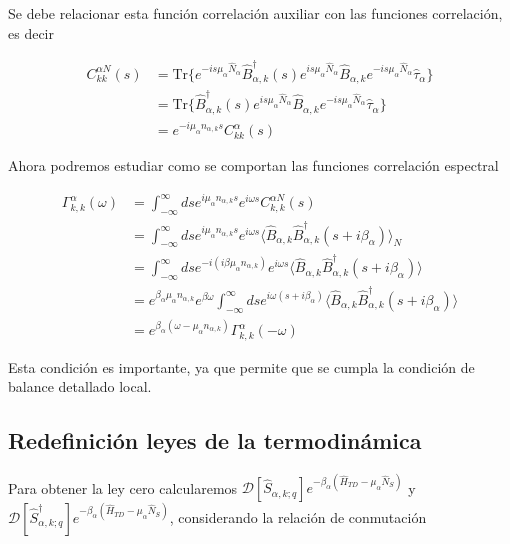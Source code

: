 \begin{appendixs}
Se debe relacionar esta función correlación auxiliar con las funciones correlación, es decir

\begin{align*}
    C^{\alpha N}_{kk}(s) & = \text{Tr}\{e^{-is\mu_{\alpha}\hat{N}_{\alpha} }\hat{B}^{\dagger}_{\alpha,k}(s)e^{is\mu_{\alpha}\hat{N}_{\alpha}} \hat{B}_{\alpha,k}e^{-is\mu_{\alpha}\hat{N}_{\alpha} }\hat{\tau}_{\alpha}   \} \\
 & = \text{Tr}\{\hat{B}^{\dagger}_{\alpha,k}(s)e^{is\mu_{\alpha}\hat{N}_{\alpha}} \hat{B}_{\alpha,k}e^{-is\mu_{\alpha}\hat{N}_{\alpha}}\hat{\tau}_{\alpha}   \}\\
 & = e^{-i\mu_{\alpha}n_{\alpha,k}s} C^{\alpha}_{kk}(s)
\end{align*}

Ahora podremos estudiar como se comportan las funciones correlación espectral

\begin{align*}
    \Gamma^{\alpha}_{k,k}(\omega) & = \int_{-\infty}^{\infty}ds e^{i\mu_{\alpha}n_{\alpha,k}s} e^{i\omega s}C^{\alpha N}_{k,k}(s) \\
    & = \int_{-\infty}^{\infty}ds e^{i\mu_{\alpha}n_{\alpha,k}s} e^{i\omega s}\langle \hat{B}_{\alpha,k} \hat{B}^{\dagger}_{\alpha,k}(s+i\beta_{\alpha}) \rangle_{N} \\
    & = \int_{-\infty}^{\infty}ds e^{-i(i\beta \mu_{\alpha}n_{\alpha,k})} e^{i\omega s} \langle \hat{B}_{\alpha,k}\hat{B}^{\dagger}_{\alpha,k}(s+i\beta_{\alpha}) \rangle \\
    & = e^{\beta_{\alpha}\mu_{\alpha}n_{\alpha,k}}e^{\beta \omega} \int_{-\infty}^{\infty} ds e^{i\omega(s+i\beta_{\alpha})} \langle \hat{B}_{\alpha,k}\hat{B}^{\dagger}_{\alpha,k}(s+i\beta_{\alpha}) \rangle \\
    & = e^{\beta_{\alpha}(\omega - \mu_{\alpha}n_{\alpha,k})} \Gamma^{\alpha}_{k,k}(-\omega)
\end{align*}


Esta condición es importante, ya que permite que se cumpla la condición de balance detallado local. 

\label{apendixKMS}


\newpage

\subsection{Redefinición leyes de la termodinámica}
Para obtener la ley cero calcularemos $\mathcal{D}[\hat{S}_{\alpha,k;q}]e^{-\beta_{\alpha}(\hat{H}_{TD} - \mu_{\alpha}\hat{N}_{S})}$ y $\mathcal{D}[\hat{S}^{\dagger}_{\alpha,k;q}]e^{-\beta_{\alpha}(\hat{H}_{TD} - \mu_{\alpha}\hat{N}_{S})}$, considerando la relación de conmutación


\end{appendixs}

